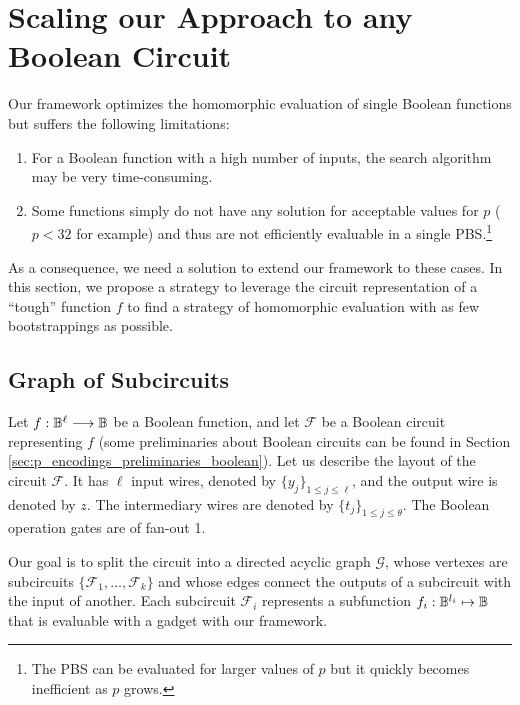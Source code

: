 \section{Scaling our Approach to any Boolean Circuit}
\label{sec:p_encodings_graphs}

Our framework optimizes the homomorphic evaluation of single Boolean functions but suffers the following limitations:

\begin{enumerate}
    \item For a Boolean function with a high number of inputs, the search algorithm may be very time-consuming.
    \item Some functions simply do not have any solution for acceptable values for $p$ ($p < 32$ for example) and thus are not efficiently evaluable in a single PBS.\footnote{The PBS can be evaluated for larger values of $p$ but it quickly becomes inefficient as $p$ grows.}
\end{enumerate}


As a consequence, we need a solution to extend our framework to these cases. In this section, we propose a strategy to leverage the circuit representation of a ``tough'' function $f$ to find a strategy of homomorphic evaluation with as few bootstrappings as possible.


\subsection{Graph of Subcircuits}
\label{sec:graph_definition}

Let $f: \mathbb{B}^\ell \longrightarrow \mathbb{B}$ be a Boolean function, and let $\mathcal{F}$ be a Boolean circuit representing $f$ (some preliminaries about Boolean circuits can be found in Section \ref{sec:p_encodings_preliminaries_boolean}). Let us describe the layout of the circuit $\mathcal{F}$. It has $\ell$ input wires, denoted by $\{y_j\}_{1 \le j \le \ell}$, and the output wire is denoted by $z$. The intermediary wires are denoted by $\{t_j\}_{1 \le j \le \theta}$. The Boolean operation gates are of fan-out 1. 


Our goal is to split the circuit into a directed acyclic graph $\mathcal{G}$, whose vertexes are subcircuits $\{\mathcal{F}_1, \dots, \mathcal{F}_k\}$ and whose edges connect the outputs of a subcircuit with the input of another. Each subcircuit $\mathcal{F}_i$ represents a subfunction $f_i: \mathbb{B}^{l_i} \mapsto \mathbb{B}$ that is evaluable with a gadget with our framework. 

